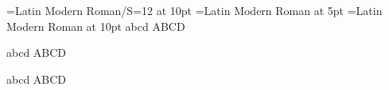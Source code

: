 

\font\testa={Latin Modern Roman/S=12} at 10pt
\font\testb={Latin Modern Roman}      at 5pt
\font\testc={Latin Modern Roman}      at 10pt
\testa abcd ABCD \par
\testb abcd ABCD \par
\testc abcd ABCD \par
\bye
